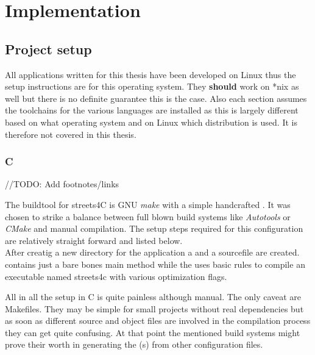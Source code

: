 \chapter{Implementation}
\label{ch:Implementation}


\setcounter{section}{-1}
\section{Project setup}
\label{sec:Implementation::Setup}

All applications written for this thesis have been developed on Linux thus the setup instructions are for this operating system. They \textbf{should} work on *nix as well but there is no definite guarantee this is the case. Also each section assumes the toolchains for the various languages are installed as this is largely different based on what operating system and on Linux which distribution is used. It is therefore not covered in this thesis.

\subsection{C}
\label{subsec:Implementation::Setup::C}

//TODO: Add footnotes/links

The buildtool for streets4C is GNU \textit{make} with a simple handcrafted . It was chosen to strike a balance between full blown build systems like \textit{Autotools} or \textit{CMake} and manual compilation. The setup steps required for this configuration are relatively straight forward and listed below.
\\


After creatig a new directory for the application a  and a sourcefile are created.  contains just a bare bones main method while the  uses basic rules to compile an executable named streets4c with various optimization flags.

All in all the setup in C is quite painless although manual. The only caveat are Makefiles. They may be simple for small projects without real dependencies but as soon as different source and object files are involved in the compilation process they can get quite confusing. At that point the mentioned build systems might prove their worth in generating the (s) from other configuration files.


